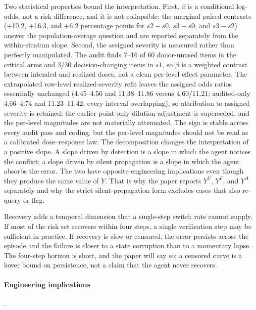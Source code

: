 \documentclass[a4paper,fleqn]{cas-sc}
\begin{document}
Two statistical properties bound the interpretation. First, $\beta$ is a conditional log-odds,
not a risk difference, and it is not collapsible: the marginal paired contrasts (+10.2, +16.3,
and +6.2 percentage points for $s2-s0$, $s3-s0$, and $s3-s2$) answer the population-average
question and are reported separately from the within-stratum slope. Second, the assigned severity
is measured rather than perfectly manipulated. The audit finds 7--16 of 60 donor-unused items in the critical
arms and 3/30 decision-changing items in $s1$, so $\beta$ is a weighted contrast between intended and
realized doses, not a clean per-level effect parameter. The extrapolated row-level realized-severity
refit leaves the assigned odds ratios essentially unchanged (4.45--4.56 and 11.38--11.86 versus
4.60/11.21; audited-only 4.66--4.74 and 11.23--11.42; every interval overlapping), so attribution
to assigned severity is retained; the earlier point-only dilution adjustment is superseded, and the
per-level magnitudes are not materially attenuated. The
sign is stable across every audit pass and coding, but the per-level magnitudes should not be read
as a calibrated dose--response law. The decomposition changes the interpretation of a positive slope. A slope driven by detection is
a slope in which the agent notices the conflict; a slope driven by silent propagation is a slope
in which the agent absorbs the error. The two have opposite engineering implications even though
they produce the same value of $Y$. That is why the paper reports $Y^{U}$, $Y^{F}$, and $Y^{A}$
separately and why the strict silent-propagation form excludes cases that also re-query or flag.

Recovery adds a temporal dimension that a single-step switch rate cannot supply. If most of the
risk set recovers within four steps, a single verification step may be sufficient in practice. If
recovery is slow or censored, the error persists across the episode and the failure is closer to
a state corruption than to a momentary lapse. The four-step horizon is short, and the paper will
say so; a censored curve is a lower bound on persistence, not a claim that the agent never
recovers.

\paragraph{Engineering implications}.\
\end{document}
